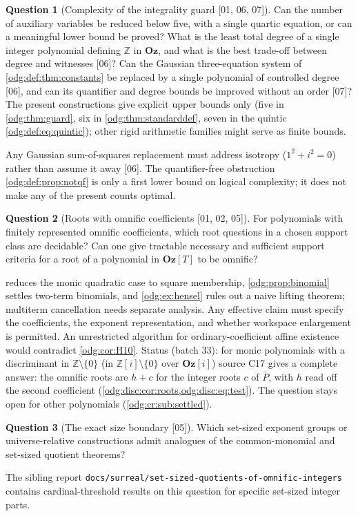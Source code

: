 \documentclass[11pt,oneside]{article}
\numberwithin{equation}{section}
\theoremstyle{definition}
\newtheorem{question}[question]{Question}
\theoremstyle{remark}
\newcommand{\Oz}{\mathbf{Oz}}
\newcommand{\Z}{\mathbb Z}
\newcommand{\src}[1]{\textup{\textsf{\small[#1]}}}
\newcommand{\fn}[1]{\nolinkurl{#1}}
\newcommand{\Og}{\Oz[i]}
\begin{document}
\begin{question}[Complexity of the integrality guard \src{01, 06, 07}]\label{odg:q:guard}
Can the number of auxiliary variables be reduced below five, with a single
quartic equation, or can a meaningful lower bound be proved? What is the least
total degree of a single integer polynomial defining $\Z$ in $\Oz$, and what
is the best trade-off between degree and witnesses \src{06}? Can the Gaussian
three-equation system of \cref{odg:def:thm:constants} be replaced by a single
polynomial of controlled degree \src{06}, and can its quantifier and degree
bounds be improved without an order \src{07}? The present constructions give
explicit upper bounds only (five in \cref{odg:thm:guard}, six in
\cref{odg:thm:standarddef}, seven in the quintic
\eqref{odg:def:eq:quintic}); other rigid arithmetic families might serve as
finite bounds.
\end{question}
Any Gaussian sum-of-squares replacement must address isotropy
($1^2+i^2=0$) rather than assume it away \src{06}. The quantifier-free
obstruction \cref{odg:def:prop:notqf} is only a first lower bound on logical
complexity; it does not make any of the present counts optimal.

\begin{question}[Roots with omnific coefficients \src{01, 02, 05}]\label{odg:q:roots}
For polynomials with finitely represented omnific coefficients, which root
questions in a chosen support class are decidable? Can one give tractable
necessary and sufficient support criteria for a root of a polynomial in
$\Oz[T]$ to be omnific?
\end{question}
 reduces the monic quadratic case to square
membership, \cref{odg:prop:binomial} settles two-term binomials, and
\cref{odg:ex:hensel} rules out a naive lifting theorem; multiterm
cancellation needs separate analysis. Any effective claim must specify the
coefficients, the exponent representation, and whether workspace enlargement
is permitted. An unrestricted algorithm for ordinary-coefficient affine
existence would contradict \cref{odg:cor:H10}. Status (batch 33): for monic
polynomials with a discriminant in $\Z\setminus\{0\}$ (in $\Z[i]\setminus\{0\}$ over $\Og$)
source C17 gives a complete answer: the omnific roots are $h+c$ for the integer roots $c$
of $\overline P$, with $h$ read off the second coefficient
(\cref{odg:disc:cor:roots,odg:disc:eq:test}). The question stays open for other
polynomials (\cref{odg:cr:sub:settled}).

\begin{question}[The exact size boundary \src{05}]\label{odg:q:size}
Which set-sized exponent groups or universe-relative constructions admit
analogues of the common-monomial and set-sized quotient theorems?
\end{question}
The sibling report \fn{docs/surreal/set-sized-quotients-of-omnific-integers}
contains cardinal-threshold results on this question for specific set-sized
integer parts.
\end{document}
